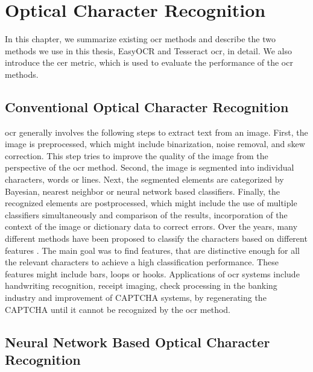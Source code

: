 \chapter{Optical Character Recognition}
\label{chap:ocr}

In this chapter, we summarize existing \gls{ocr} methods and describe the two methods we use in this thesis, EasyOCR and Tesseract \gls{ocr}, in detail.
We also introduce the \gls{cer} metric, which is used to evaluate the performance of the \gls{ocr} methods.

\section{Conventional Optical Character Recognition}

\Gls{ocr} \cite{ocr_survey_2017} generally involves the following steps to extract text from an image.
First, the image is preprocessed, which might include binarization, noise removal, and skew correction.
This step tries to improve the quality of the image from the perspective of the \gls{ocr} method.
Second, the image is segmented into individual characters, words or lines.
Next, the segmented elements are categorized by Bayesian, nearest neighbor or neural network based classifiers.
Finally, the recognized elements are postprocessed, which might include the use of multiple classifiers simultaneously and comparison of the results, incorporation of the context of the image or dictionary data to correct errors.
Over the years, many different methods have been proposed to classify the characters based on different features \cite{ocr_appl_survey_2014}\cite{ocr_appl_survey_2016}.
The main goal was to find features, that are distinctive enough for all the relevant characters to achieve a high classification performance.
These features might include bars, loops or hooks.
Applications of \gls{ocr} systems include handwriting recognition, receipt imaging, check processing in the banking industry and improvement of CAPTCHA systems, by regenerating the CAPTCHA until it cannot be recognized by the \gls{ocr} method.


\section{Neural Network Based Optical Character Recognition}

